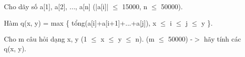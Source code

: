 Cho dãy số a[1], a[2], ..., a[n] (|a[i]|  $\le$  15000, n  $\le$  50000).  

   Hàm q(x, y) = max \{ tổng(a[i]+a[i+1]+...+a[j]), x  $\le$  i  $\le$  j  $\le$  y \}.  

   Cho m câu hỏi dạng x, y (1  $\le$  x  $\le$  y  $\le$  n). (m  $\le$  50000) -$>$ hãy tính các q(x, y).   
\\
\\